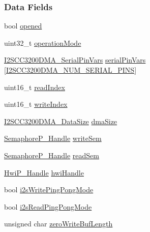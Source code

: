 \subsubsection*{Data Fields}
\begin{DoxyCompactItemize}
\item 
bool \hyperlink{struct_i2_s_c_c3200_d_m_a___object_a6026739b85a6fc1025a928341306be66}{opened}
\item 
uint32\+\_\+t \hyperlink{struct_i2_s_c_c3200_d_m_a___object_a075dffee83187f507dcdd18e5ac9fceb}{operation\+Mode}
\item 
\hyperlink{struct_i2_s_c_c3200_d_m_a___serial_pin_vars}{I2\+S\+C\+C3200\+D\+M\+A\+\_\+\+Serial\+Pin\+Vars} \hyperlink{struct_i2_s_c_c3200_d_m_a___object_ab36fa0f983540968b2104a210b1f26e9}{serial\+Pin\+Vars} \mbox{[}\hyperlink{_i2_s_c_c3200_d_m_a_8h_a16c3369e33e69e4d870c2093e4451c03}{I2\+S\+C\+C3200\+D\+M\+A\+\_\+\+N\+U\+M\+\_\+\+S\+E\+R\+I\+A\+L\+\_\+\+P\+I\+N\+S}\mbox{]}
\item 
uint16\+\_\+t \hyperlink{struct_i2_s_c_c3200_d_m_a___object_a577202e08470f5b6aa52485aeb2787cc}{read\+Index}
\item 
uint16\+\_\+t \hyperlink{struct_i2_s_c_c3200_d_m_a___object_adb3e00f9137c6da822f8eab13f1d161a}{write\+Index}
\item 
\hyperlink{_i2_s_c_c3200_d_m_a_8h_a712825340a80cc76e6ce4d6330ca3687}{I2\+S\+C\+C3200\+D\+M\+A\+\_\+\+Data\+Size} \hyperlink{struct_i2_s_c_c3200_d_m_a___object_afa56bc2303836af45e73df58ee6980d6}{dma\+Size}
\item 
\hyperlink{_semaphore_p_8h_a7f34865f33e666455692544e5f12d1f2}{Semaphore\+P\+\_\+\+Handle} \hyperlink{struct_i2_s_c_c3200_d_m_a___object_a34707c54cdce768259b923e301bec6c8}{write\+Sem}
\item 
\hyperlink{_semaphore_p_8h_a7f34865f33e666455692544e5f12d1f2}{Semaphore\+P\+\_\+\+Handle} \hyperlink{struct_i2_s_c_c3200_d_m_a___object_a41741d2aa61bd69b095db4e2d83c6075}{read\+Sem}
\item 
\hyperlink{_hwi_p_8h_a7dd325ff62af296374efc6d317f5e368}{Hwi\+P\+\_\+\+Handle} \hyperlink{struct_i2_s_c_c3200_d_m_a___object_ac09262f4b55471c1e628bc5c61eac9f4}{hwi\+Handle}
\item 
bool \hyperlink{struct_i2_s_c_c3200_d_m_a___object_a1e38a4e9778330f7360c3701bec3b01d}{i2s\+Write\+Ping\+Pong\+Mode}
\item 
bool \hyperlink{struct_i2_s_c_c3200_d_m_a___object_af42dcae290d228e2da8fc738e38b190b}{i2s\+Read\+Ping\+Pong\+Mode}
\item 
unsigned char \hyperlink{struct_i2_s_c_c3200_d_m_a___object_a7466dafa414526814a4f70f3d357fc65}{zero\+Write\+Buf\+Length}

\end{DoxyCompactItemize}
